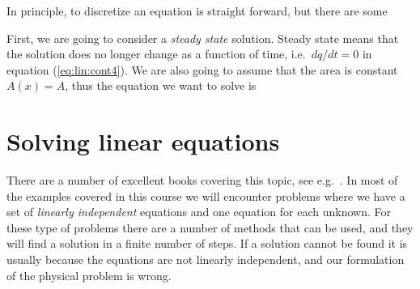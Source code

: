 \documentclass[graybox,sectrefs,envcountresetchap,open=right,final]{svmonodo}
\begin{document}
In principle, to discretize an equation is straight forward, but there are some 

First, we are going to consider a \emph{steady state} solution. Steady state means that the solution does no longer change as a function of time, i.e.~$dq/dt=0$ in equation (\ref{eq:lin:cont4}). We are also going to assume that the area is constant $A(x)=A$, thus the equation we want to solve is

\section{Solving linear equations}
There are a number of excellent books covering this topic, see e.g.~\cite{press2007,trefethen1997,stoer2013,strang2019}.
In most of the examples covered in this course we will encounter problems where we have a set of \emph{linearly independent} equations and one equation for each unknown. For these type of problems there are a number of methods that can be used, and they will find a solution in a finite number of steps. If a solution cannot be found it is usually because the equations are not linearly independent, and our formulation of the physical problem is wrong.
\end{document}
